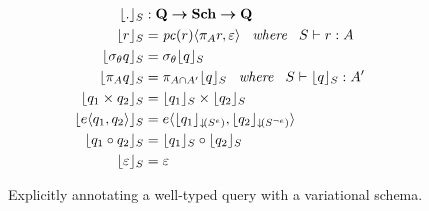 \begin{figure}
\begin{alignat*}{1}
\constrain . &: \qSet \totype \vSchSet \totype \qSet\\
%
\constrain \vRel &= 
\chc [\getPC {\vRel}] {\vPrj \vRel, \empRel}
\hspace{5pt} \textit{ where } \hspace{5pt}
\envWithoutVctx   {\vRel} {\vAttList}
\\
\constrain {\vSel \vQ}  &=  \vSel {\constrain \vQ}
\\
%
\constrain {\vPrj [\vAttList] \vQ} &= 
\vPrj [\vAttList \cap \VVal \vAttList] {\constrain \vQ}
\hspace{5pt} \textit{ where } \hspace{5pt}
\envWithoutVctx {{\constrain \vQ}} {\VVal \vAttList}
\\
%
\constrain {{\vQ_1} \times {\vQ_2}} &= 
\constrain {\vQ_1} \times \constrain {\vQ_2}
\\
%
%
\constrain {\chc {\vQ_1, \vQ_2}} &= 
\chc {\constrain [\pushIn {\annot [\dimMeta] \vSch}] {\vQ_1}, \constrain [\pushIn {\annot [\neg \dimMeta] \vSch}] {\vQ_2}}
\\
%
\constrain {{\vQ_1} \circ {\vQ_2}} &= 
\constrain {\vQ_1} \circ \constrain {\vQ_2}\\
%
\constrain {\empRel} &= \empRel
\end{alignat*}
\caption[Explicitly annotating a variational query with a variational schema]{
Explicitly annotating a well-typed query with a variational schema. 
}
\label{fig:constrain}
\end{figure}
